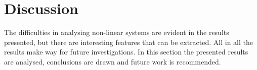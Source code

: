 \documentclass[../main2.tex]{subfiles}
\providecommand{\rootdir}{..}
\begin{document}
\section{Discussion}\label{discussion}
The difficulties in analysing non-linear systems are evident in the results presented, but there are interesting features that can be extracted. All in all the results make way for future investigations. In this section the presented results are analysed, conclusions are drawn and future work is recommended.

%

%
\end{document}
